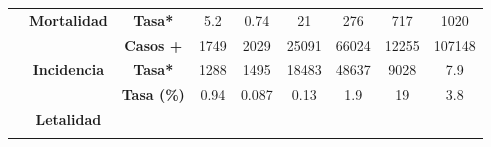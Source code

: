 \begin{tabular}{ccc|cccccc|}
		\multicolumn{1}{|c|}{\cellcolor[HTML]{ECF4FF}} &
		\multicolumn{1}{c|}{\multirow{-2}{*}{\cellcolor[HTML]{ECF4FF}\textbf{Mortalidad}}} &
		\textbf{Tasa*} &
		\multicolumn{1}{c|}{\cellcolor[HTML]{ECF4FF}5.2} &
		\multicolumn{1}{c|}{\cellcolor[HTML]{ECF4FF}0.74} &
		\multicolumn{1}{c|}{\cellcolor[HTML]{ECF4FF}21} &
		\multicolumn{1}{c|}{\cellcolor[HTML]{ECF4FF}276} &
		\multicolumn{1}{c|}{\cellcolor[HTML]{ECF4FF}717} &
		1020 \\ \cline{2-9} 
		\rowcolor[HTML]{ECF4FF} 
		\multicolumn{1}{|c|}{\cellcolor[HTML]{ECF4FF}} &
		\multicolumn{1}{c|}{\cellcolor[HTML]{ECF4FF}} &
		\textbf{Casos +} &
		\multicolumn{1}{c|}{\cellcolor[HTML]{ECF4FF}1749} &
		\multicolumn{1}{c|}{\cellcolor[HTML]{ECF4FF}2029} &
		\multicolumn{1}{c|}{\cellcolor[HTML]{ECF4FF}25091} &
		\multicolumn{1}{c|}{\cellcolor[HTML]{ECF4FF}66024} &
		\multicolumn{1}{c|}{\cellcolor[HTML]{ECF4FF}12255} &
		107148 \\ \cline{3-9} 
		\rowcolor[HTML]{ECF4FF} 
		\multicolumn{1}{|c|}{\multirow{-6}{*}{\cellcolor[HTML]{ECF4FF}\textbf{2020}}} &
		\multicolumn{1}{c|}{\multirow{-2}{*}{\cellcolor[HTML]{ECF4FF}\textbf{Incidencia}}} &
		\textbf{Tasa*} &
		\multicolumn{1}{c|}{\cellcolor[HTML]{ECF4FF}1288} &
		\multicolumn{1}{c|}{\cellcolor[HTML]{ECF4FF}1495} &
		\multicolumn{1}{c|}{\cellcolor[HTML]{ECF4FF}18483} &
		\multicolumn{1}{c|}{\cellcolor[HTML]{ECF4FF}48637} &
		\multicolumn{1}{c|}{\cellcolor[HTML]{ECF4FF}9028} &
		7.9 \\ \hline
		\rowcolor[HTML]{FFFFC7} 
		\multicolumn{1}{|c|}{\cellcolor[HTML]{FFFFC7}} &
		\multicolumn{1}{c|}{\cellcolor[HTML]{FFFFC7}} &
		\textbf{Tasa (\%)} &
		\multicolumn{1}{c|}{\cellcolor[HTML]{FFFFC7}0.94} &
		\multicolumn{1}{c|}{\cellcolor[HTML]{FFFFC7}0.087} &
		\multicolumn{1}{c|}{\cellcolor[HTML]{FFFFC7}0.13} &
		\multicolumn{1}{c|}{\cellcolor[HTML]{FFFFC7}1.9} &
		\multicolumn{1}{c|}{\cellcolor[HTML]{FFFFC7}19} &
		3.8 \\ \cline{3-9} 
		\rowcolor[HTML]{FFFFC7} 
		\multicolumn{1}{|c|}{\cellcolor[HTML]{FFFFC7}} &
		\multicolumn{1}{c|}{\multirow{-2}{*}{\cellcolor[HTML]{FFFFC7}\textbf{Letalidad}}} &
		\cellcolor[HTML]{FFFFC7} &
		\multicolumn{1}{c|}{\cellcolor[HTML]{FFFFC7}} &
		\multicolumn{1}{c|}{\cellcolor[HTML]{FFFFC7}} &
		\multicolumn{1}{c|}{\cellcolor[HTML]{FFFFC7}} &
		\multicolumn{1}{c|}{\cellcolor[HTML]{FFFFC7}} &
		\multicolumn{1}{c|}{\cellcolor[HTML]{FFFFC7}} &
		\cellcolor[HTML]{FFFFC7} \\ \cline{2-2}
		\rowcolor[HTML]{FFFFC7} 
		\multicolumn{1}{|c|}{\cellcolor[HTML]{FFFFC7}} &
		\multicolumn{1}{c|}{\cellcolor[HTML]{FFFFC7}} &

\end{tabular}
